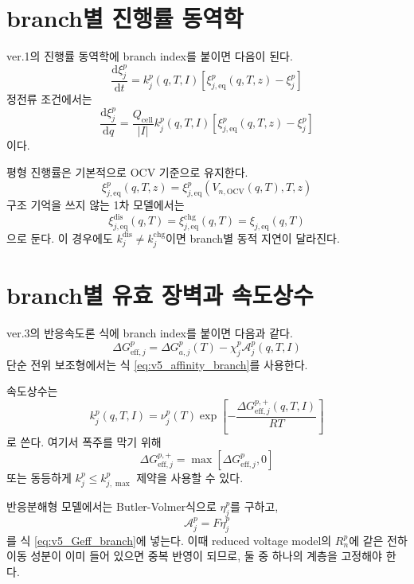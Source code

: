 \documentclass[11pt,a4paper]{article}
\newcommand{\dd}{\mathrm{d}}
\newcommand{\OCV}{\mathrm{OCV}}
\newcommand{\eff}{\mathrm{eff}}
\newcommand{\eq}{\mathrm{eq}}
\newcommand{\cell}{\mathrm{cell}}
\newcommand{\dis}{\mathrm{dis}}
\newcommand{\chg}{\mathrm{chg}}
\begin{document}
\section{branch별 진행률 동역학}
ver.1의 진행률 동역학에 branch index를 붙이면 다음이 된다.
\begin{equation}
\frac{\dd\xi_j^{p}}{\dd t}
=
k_j^{p}(q,T,I)
\left[
\xi_{j,\eq}^{p}(q,T,z)-\xi_j^{p}
\right]
\label{eq:v5_xi_branch_time}
\end{equation}
정전류 조건에서는
\begin{equation}
\frac{\dd\xi_j^{p}}{\dd q}
=
\frac{Q_{\cell}}{|I|}
k_j^{p}(q,T,I)
\left[
\xi_{j,\eq}^{p}(q,T,z)-\xi_j^{p}
\right]
\label{eq:v5_xi_branch_q}
\end{equation}
이다.

평형 진행률은 기본적으로 OCV 기준으로 유지한다.
\begin{equation}
\xi_{j,\eq}^{p}(q,T,z)
=
\xi_{j,\eq}^{p}\!\left(V_{n,\OCV}(q,T),T,z\right)
\end{equation}
구조 기억을 쓰지 않는 1차 모델에서는
\begin{equation}
\xi_{j,\eq}^{\dis}(q,T)=\xi_{j,\eq}^{\chg}(q,T)=\xi_{j,\eq}(q,T)
\end{equation}
으로 둔다. 이 경우에도 \(k_j^{\dis}\neq k_j^{\chg}\)이면 branch별 동적 지연이 달라진다.

\section{branch별 유효 장벽과 속도상수}
ver.3의 반응속도론 식에 branch index를 붙이면 다음과 같다.
\begin{equation}
\Delta G_{\eff,j}^{p}
=
\Delta G_{a,j}^{p}(T)
-
\chi_j^{p}\mathcal A_j^{p}(q,T,I)
\label{eq:v5_Geff_branch}
\end{equation}
단순 전위 보조형에서는 식 \eqref{eq:v5_affinity_branch}를 사용한다.

속도상수는
\begin{equation}
k_j^{p}(q,T,I)
=
\nu_j^{p}(T)
\exp\left[-\frac{\Delta G_{\eff,j}^{p,+}(q,T,I)}{RT}\right]
\label{eq:v5_k_branch}
\end{equation}
로 쓴다. 여기서 폭주를 막기 위해
\begin{equation}
\Delta G_{\eff,j}^{p,+}
=
\max\left[\Delta G_{\eff,j}^{p},0\right]
\end{equation}
또는 동등하게 \(k_j^{p}\leq k_{j,\max}^{p}\) 제약을 사용할 수 있다.

반응분해형 모델에서는 Butler-Volmer식으로 \(\eta_j^p\)를 구하고,
\begin{equation}
\mathcal A_j^p=F\eta_j^p
\end{equation}
를 식 \eqref{eq:v5_Geff_branch}에 넣는다. 이때 reduced voltage model의 \(R_n^p\)에 같은 전하이동 성분이 이미 들어 있으면 중복 반영이 되므로, 둘 중 하나의 계층을 고정해야 한다.
\end{document}
